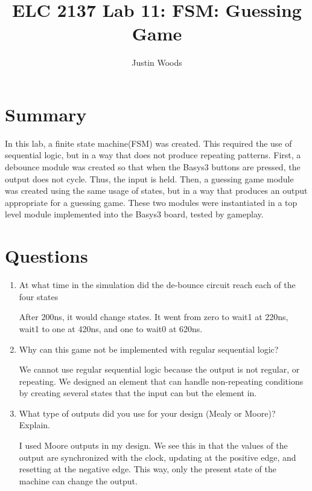 \documentclass[11pt]{article}
\begin{document}
\title{ELC 2137 Lab 11: FSM: Guessing Game}
\author{Justin Woods}
\maketitle

\section*{Summary}
	In this lab, a finite state machine(FSM) was created. This required the use of sequential logic, but in a way that does not produce repeating patterns. First, a debounce module was created so that when the Basys3 buttons are pressed, the output does not cycle. Thus, the input is held. Then, a guessing game module was created using the same usage of states, but in a way that produces an output appropriate for a guessing game. These two modules were instantiated in a top level module implemented into the Basys3 board, tested by gameplay. 

\section*{Questions}

\begin{enumerate}
	\item At what time in the simulation did the de-bounce circuit reach each of the four states
	
	After 200ns, it would change states. It went from zero to wait1 at 220ns, wait1 to one at 420ns, and one to wait0 at 620ns.
	
	\item Why  can  this  game  not  be  implemented with regular sequential logic?
	
	We cannot use regular sequential logic because the output is not regular, or repeating. We designed an element that can handle non-repeating conditions by creating several states that the input can but the element in. 

	\item What type of outputs did you use for your design (Mealy or Moore)?  Explain.
	
	I used Moore outputs in my design. We see this in that the values of the output are synchronized with the clock, updating at the positive edge, and resetting at the negative edge. This way, only the present state of the machine can change the output.  

\end{enumerate}
\clearpage
\end{document}
